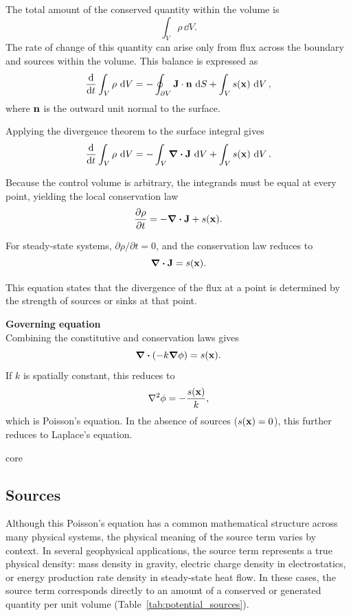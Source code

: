 {    The total amount of the conserved quantity within the volume is
    \[
        \int_V \rho \, \dd{V}.
    \]
    The rate of change of this quantity can arise only from flux across the boundary and sources within the volume. This balance is expressed as
    \[
        \dv{}{t}\int_V \rho \, \dd{V}
        = - \oint_{\partial V} \vb{J} \cdot \vb{n}\, \dd{S}
        + \int_V s(\vb{x}) \, \dd{V},
    \]
    where $\vb{n}$ is the outward unit normal to the surface.

    Applying the divergence theorem to the surface integral gives
    \[
        \dv{}{t}\int_V \rho \, \dd{V}
        = - \int_V \div \vb{J}\, \dd{V}
        + \int_V s(\vb{x}) \, \dd{V}.
    \]

    Because the control volume is arbitrary, the integrands must be equal at every point, yielding the local conservation law
    \[
        \pdv{\rho}{t} = - \div \vb{J} + s(\vb{x}).
    \]

    For steady-state systems, $\partial \rho / \partial t = 0$, and the conservation law reduces to
    \[
        \div \vb{J} = s(\vb{x}).
    \]

    This equation states that the divergence of the flux at a point is determined by the strength of sources or sinks at that point.

    \medskip
    \noindent\textbf{Governing equation} \\
    Combining the constitutive and conservation laws gives
    \[
    \div(-k\grad\phi) = s(\vb{x}).
    \]
    If $k$ is spatially constant, this reduces to
    \[
    \laplacian\phi = -\frac{s(\vb{x})}{k},
    \]
    which is Poisson's equation. In the absence of sources ($s(\vb{x})=0$), this further reduces to Laplace's equation.
}{core}

\subsection{Sources}
Although this Poisson's equation has a common mathematical structure across many physical systems, the physical meaning of the source term varies by context.  In several geophysical applications, the source term represents a true physical density: mass density in gravity, electric charge density in electrostatics, or energy production rate density in steady-state heat flow. In these cases, the source term corresponds directly to an amount of a conserved or generated quantity per unit volume (Table~\ref{tab:potential_sources}).



